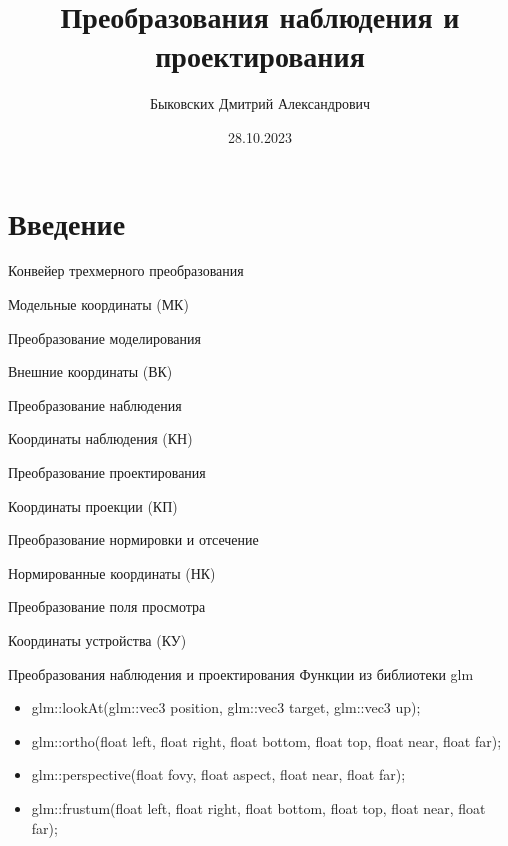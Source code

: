 \documentclass{beamer}
\title[Наблюдение и проектирование]{Преобразования наблюдения и проектирования}
\author[Быковских Д.А.]{Быковских Дмитрий Александрович}
\date{28.10.2023}
\begin{document}
	\begin{frame}
		\titlepage
	\end{frame}

	\section{Введение}

	\begin{frame}{Конвейер трехмерного преобразования}
		
		{\hfill
		Модельные координаты (МК)
		}
		
		Преобразование моделирования
		
		{\hfill
		Внешние координаты (ВК)
		}

		Преобразование наблюдения

		{\hfill
		Координаты наблюдения (КН)
		}

		Преобразование проектирования
		
		{\hfill
		Координаты проекции (КП)
		}
		
		Преобразование нормировки и отсечение
		
		{\hfill
		Нормированные координаты (НК)
		}

		Преобразование поля просмотра
		
		{\hfill
		Координаты устройства (КУ)
		}				
	\end{frame}

	\begin{frame}{Преобразования наблюдения и проектирования}
		Функции из библиотеки glm
		\begin{itemize}
			\item glm::lookAt(glm::vec3 position, glm::vec3 target, glm::vec3 up);
			\item glm::ortho(float left, float right, float bottom, float top, float near, float far);
			\item glm::perspective(float fovy, float aspect, float near, float far);
			\item glm::frustum(float left, float right, float bottom, float top, float near, float far);
		\end{itemize}
	\end{frame}
\end{document}
